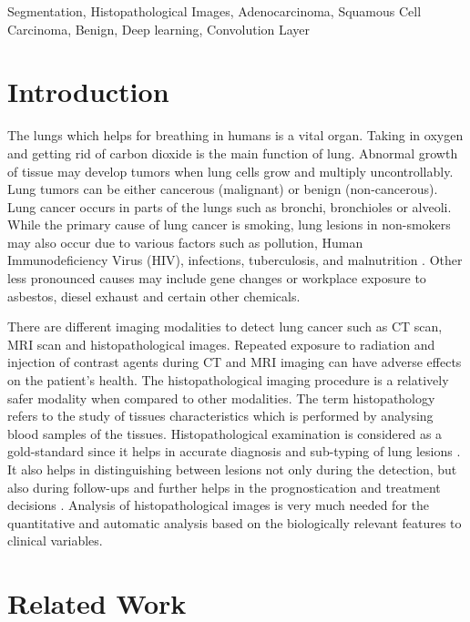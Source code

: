 \documentclass{comjnl}
\begin{document}
\begin{keywords}
Segmentation, Histopathological Images, Adenocarcinoma, Squamous Cell Carcinoma, Benign, Deep learning, Convolution Layer
\end{keywords}


\section{Introduction}
 The lungs which helps for breathing in humans is a vital organ. Taking in oxygen and getting rid of carbon dioxide is the main function of lung. Abnormal growth of tissue may develop tumors when lung cells grow and multiply uncontrollably.  Lung tumors can be either cancerous (malignant) or benign (non-cancerous). Lung cancer occurs in parts of the lungs such as bronchi, bronchioles or alveoli. While the primary cause of lung cancer is smoking, lung lesions in non-smokers may also occur due to various factors such as pollution, Human Immunodeficiency Virus (HIV), infections, tuberculosis, and malnutrition \cite{lad}. Other less pronounced causes may include gene changes or workplace exposure to asbestos, diesel exhaust and certain other chemicals. 
 
 There are different imaging modalities to detect lung cancer such as CT scan, MRI scan and histopathological images. Repeated exposure to radiation and injection of contrast agents during CT and MRI imaging can have adverse effects on the patient's health. The histopathological imaging procedure is a relatively safer modality when compared to other modalities. The term histopathology refers to the study of tissues characteristics which is performed by analysing blood samples of the tissues. Histopathological examination is considered as a gold-standard since it helps in accurate diagnosis and sub-typing of lung lesions \cite{histo_study_lungbiopsy}. It also helps in distinguishing between lesions not only during the detection, but also during follow-ups and further helps in the prognostication and treatment decisions \cite{histopath_role}. Analysis of histopathological images is very much needed for the quantitative and automatic analysis  based  on the biologically relevant features to clinical variables.

\section{Related Work}

\end{document}

